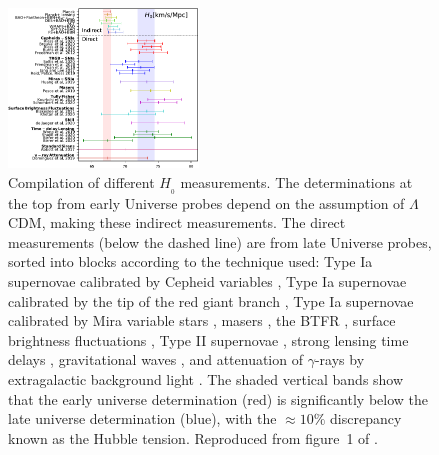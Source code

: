 \documentclass[fleqn,usenatbib,useAMS,onecolumn]{mnras} %
\begin{document}
\begin{figure}
	\centering
	\includegraphics[width=0.45\textwidth]{Valentino_2021_Figure_1}
	\caption{Compilation of different $H_{_0}$ measurements. The determinations at the top from early Universe probes depend on the assumption of $\Lambda$CDM, making these indirect measurements. The direct measurements (below the dashed line) are from late Universe probes, sorted into blocks according to the technique used: Type Ia supernovae calibrated by Cepheid variables \citep{Freedman_2012, Burns_2018, Breuval_2020, Riess_2019, Riess_2021}, Type Ia supernovae calibrated by the tip of the red giant branch \citep{Jang_2017, Reid_2019, Yuan_2019, Freedman_2020, Soltis_2021}, Type Ia supernovae calibrated by Mira variable stars \citep{Huang_2020}, masers \citep{Pesce_2020}, the BTFR \citep{Kourkchi_2020, Schombert_2020}, surface brightness fluctuations \citep{Blakeslee_2021, Khetan_2021}, Type II supernovae \citep{Jaeger_2020}, strong lensing time delays \citep{Birrer_2020, Shajib_2020, Wong_2020}, gravitational waves \citep{Abbott_2017}, and attenuation of $\gamma$-rays by extragalactic background light \citep{Dominguez_2019}. The shaded vertical bands show that the early universe determination (red) is significantly below the late universe determination (blue), with the $\approx10\%$ discrepancy known as the Hubble tension. Reproduced from figure~1 of \citep{Valentino_2021}.}
	\label{Valentino_2021_Figure_1}
\end{figure}
\end{document}
